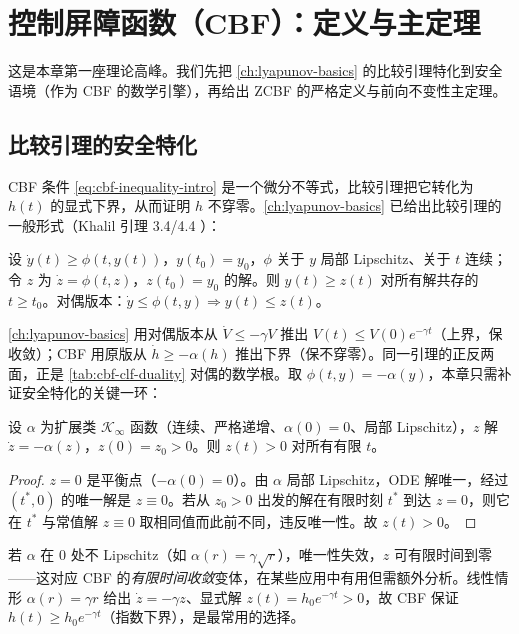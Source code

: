 \section{控制屏障函数（CBF）：定义与主定理}
\label{sec:cbf-main}

这是本章第一座理论高峰。我们先把 \cref{ch:lyapunov-basics} 的比较引理特化到安全语境（作为 CBF 的数学引擎），再给出 ZCBF 的严格定义与前向不变性主定理。

\subsection{比较引理的安全特化}
\label{sec:comparison}

CBF 条件 \cref{eq:cbf-inequality-intro} 是一个微分不等式，比较引理把它转化为 $h(t)$ 的显式下界，从而证明 $h$ 不穿零。\cref{ch:lyapunov-basics} 已给出比较引理的一般形式（Khalil 引理 3.4/4.4 \cite{khalil2002nonlinear}）：

\begin{lemma}\label{lem:comparison}
设 $\dot y(t)\ge\phi(t,y(t))$，$y(t_0)=y_0$，$\phi$ 关于 $y$ 局部 Lipschitz、关于 $t$ 连续；令 $z$ 为 $\dot z=\phi(t,z)$，$z(t_0)=y_0$ 的解。则 $y(t)\ge z(t)$ 对所有解共存的 $t\ge t_0$。对偶版本：$\dot y\le\phi(t,y)\Rightarrow y(t)\le z(t)$。
\end{lemma}

\cref{ch:lyapunov-basics} 用对偶版本从 $\dot V\le-\gamma V$ 推出 $V(t)\le V(0)e^{-\gamma t}$（上界，保收敛）；CBF 用原版从 $\dot h\ge-\alpha(h)$ 推出下界（保不穿零）。同一引理的正反两面，正是 \cref{tab:cbf-clf-duality} 对偶的数学根。取 $\phi(t,y)=-\alpha(y)$，本章只需补证安全特化的关键一环：

\begin{proposition}\label{prop:no-cross-zero}
设 $\alpha$ 为扩展类 $\mathcal K_\infty$ 函数（连续、严格递增、$\alpha(0)=0$、局部 Lipschitz），$z$ 解 $\dot z=-\alpha(z)$，$z(0)=z_0>0$。则 $z(t)>0$ 对所有有限 $t$。
\end{proposition}

\begin{proof}
$z=0$ 是平衡点（$-\alpha(0)=0$）。由 $\alpha$ 局部 Lipschitz，ODE 解唯一，经过 $(t^*,0)$ 的唯一解是 $z\equiv0$。若从 $z_0>0$ 出发的解在有限时刻 $t^*$ 到达 $z=0$，则它在 $t^*$ 与常值解 $z\equiv0$ 取相同值而此前不同，违反唯一性。故 $z(t)>0$。
\end{proof}

\begin{remark}
若 $\alpha$ 在 $0$ 处不 Lipschitz（如 $\alpha(r)=\gamma\sqrt r$），唯一性失效，$z$ 可有限时间到零——这对应 CBF 的\emph{有限时间收敛}变体，在某些应用中有用但需额外分析。线性情形 $\alpha(r)=\gamma r$ 给出 $\dot z=-\gamma z$、显式解 $z(t)=h_0e^{-\gamma t}>0$，故 CBF 保证 $h(t)\ge h_0e^{-\gamma t}$（指数下界），是最常用的选择。
\end{remark}

